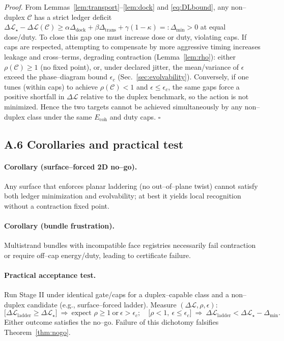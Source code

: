 \documentclass[11pt]{article}
\begin{document}
\emph{Proof.}
From Lemmas~\ref{lem:transport}–\ref{lem:dock} and \eqref{eq:DLbound}, any non–duplex $\mathcal{C}$ has a strict ledger deficit $\Delta\mathcal{L}_\star-\Delta\mathcal{L}(\mathcal{C})\ge \alpha\Delta_{\mathrm{dock}}+\beta\Delta_{\mathrm{trans}}+\gamma(1-\kappa)=:\Delta_{\min}>0$ at equal dose/duty. To close this gap one must increase dose or duty, violating caps. If caps are respected, attempting to compensate by more aggressive timing increases leakage and cross–terms, degrading contraction (Lemma~\ref{lem:rho}): either $\rho(\mathcal{C})\ge 1$ (no fixed point), or, under declared jitter, the mean/variance of $\epsilon$ exceed the phase–diagram bound $\epsilon_c$ (Sec.~\ref{sec:evolvability}). Conversely, if one tunes (within caps) to achieve $\rho(\mathcal{C})<1$ and $\epsilon\le \epsilon_c$, the same gaps force a positive shortfall in $\Delta\mathcal{L}$ relative to the duplex benchmark, so the action is not minimized. Hence the two targets cannot be achieved simultaneously by any non–duplex class under the same $E_{\mathrm{coh}}$ and duty caps. \hfill$\square$

\subsection*{A.6 Corollaries and practical test}
\paragraph{Corollary (surface–forced 2D no–go).}
Any surface that enforces planar laddering (no out–of–plane twist) cannot satisfy both ledger minimization and evolvability; at best it yields local recognition without a contraction fixed point.

\paragraph{Corollary (bundle frustration).}
Multistrand bundles with incompatible face registries necessarily fail contraction or require off–cap energy/duty, leading to certificate failure.

\paragraph{Practical acceptance test.}
Run Stage II under identical gate/caps for a duplex–capable class and a non–duplex candidate (e.g., surface–forced ladder). Measure $(\Delta\mathcal{L},\rho,\epsilon)$:
\[
\big[\Delta\mathcal{L}_{\mathrm{ladder}}\ge \Delta\mathcal{L}_\star\big]\ \Rightarrow\ \text{expect } \rho\ge 1\ \text{or}\ \epsilon>\epsilon_c;\quad
\big[\rho<1,\ \epsilon\le \epsilon_c\big]\ \Rightarrow\ \Delta\mathcal{L}_{\mathrm{ladder}}<\Delta\mathcal{L}_\star-\Delta_{\min}.
\]
Either outcome satisfies the no–go. Failure of this dichotomy falsifies Theorem~\ref{thm:nogo}.
\end{document}
